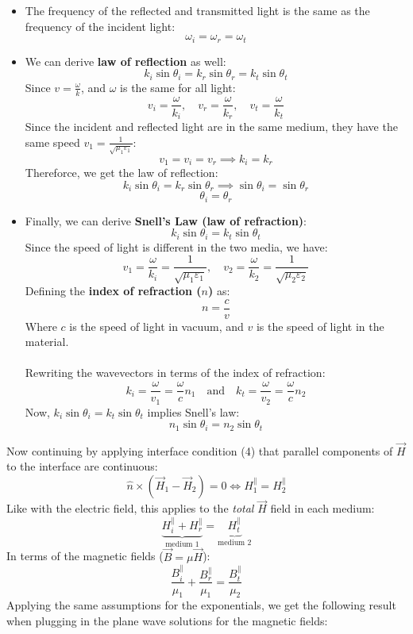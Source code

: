 \documentclass[12pt]{article}
\begin{document}
\begin{itemize}
    \item The frequency of the reflected and transmitted light is the same as the frequency of the incident light:
    \[\boxed{\omega_i = \omega_r = \omega_t}\]
    \item We can derive \textbf{law of reflection} as well:
    \[k_i\sin\theta_i = k_r\sin\theta_r = k_t\sin\theta_t\]
    Since $v = \frac{\omega}{k}$, and $\omega$ is the same for all light:
    \[v_i = \frac{\omega}{k_i},\quad v_r = \frac{\omega}{k_r},\quad v_t = \frac{\omega}{k_t}\]
    Since the incident and reflected light are in the same medium, they have the same speed $v_1 = \frac{1}{\sqrt{\mu_1 \varepsilon_1}}$:
    \[v_1 = v_i = v_r \implies k_i = k_r\]
    Thereforce, we get the law of reflection:
    \[k_i\sin\theta_i = k_r\sin\theta_r \implies \sin\theta_i = \sin\theta_r\]
    \[\boxed{\theta_i = \theta_r}\]
    \item Finally, we can derive \textbf{Snell's Law (law of refraction)}:
    \[k_i\sin\theta_i = k_t\sin\theta_t\]
    Since the speed of light is different in the two media, we have:
    \[v_1 = \frac{\omega}{k_i} = \frac{1}{\sqrt{\mu_1 \varepsilon_1}},\quad v_2 = \frac{\omega}{k_2} = \frac{1}{\sqrt{\mu_2 \varepsilon_2}}\]
    Defining the \textbf{index of refraction ($n$)} as:
    \[\boxed{n = \frac{c}{v}}\]
    Where $c$ is the speed of light in vacuum, and $v$ is the speed of light in the material.\\\\
    Rewriting the wavevectors in terms of the index of refraction:
    \[k_i = \frac{\omega}{v_1} = \frac{\omega}{c} n_1 \quad \text{and} \quad k_t = \frac{\omega}{v_2} = \frac{\omega}{c} n_2\]
    Now, $k_i\sin\theta_i = k_t\sin\theta_t$ implies Snell's law:
    \[\boxed{n_1\sin\theta_i = n_2 \sin\theta_t}\]
\end{itemize}
Now continuing by applying interface condition (4) that parallel components of $\vec{H}$ to the interface are continuous:
\[\hat{n} \times (\vec{H}_1 - \vec{H}_2) = 0 \iff H_1^\parallel = H_2^\parallel\]
Like with the electric field, this applies to the \textit{total} $\vec{H}$ field in each medium:
\[\underbrace{H_i^\parallel + H_r^\parallel}_{\text{medium 1}} = \underbrace{H_t^\parallel}_{\text{medium 2}}\]
In terms of the magnetic fields ($\vec{B} = \mu \vec{H}$):
\[\frac{B_i^\parallel}{\mu_1} + \frac{B_r^\parallel}{\mu_1} = \frac{B_t^\parallel}{\mu_2}\]
Applying the same assumptions for the exponentials, we get the following result when plugging in the plane wave solutions for the magnetic fields:
\end{document}
